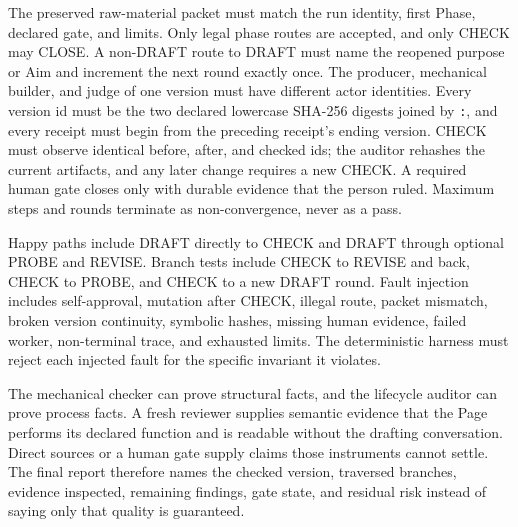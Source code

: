 The preserved raw-material packet must match the run identity, first Phase, declared gate, and limits. Only legal phase routes are accepted, and only CHECK may CLOSE. A non-DRAFT route to DRAFT must name the reopened purpose or Aim and increment the next round exactly once. The producer, mechanical builder, and judge of one version must have different actor identities. Every version id must be the two declared lowercase SHA-256 digests joined by \texttt{:}, and every receipt must begin from the preceding receipt's ending version. CHECK must observe identical before, after, and checked ids; the auditor rehashes the current artifacts, and any later change requires a new CHECK. A required human gate closes only with durable evidence that the person ruled. Maximum steps and rounds terminate as non-convergence, never as a pass.

Happy paths include DRAFT directly to CHECK and DRAFT through optional PROBE and REVISE. Branch tests include CHECK to REVISE and back, CHECK to PROBE, and CHECK to a new DRAFT round. Fault injection includes self-approval, mutation after CHECK, illegal route, packet mismatch, broken version continuity, symbolic hashes, missing human evidence, failed worker, non-terminal trace, and exhausted limits. The deterministic harness must reject each injected fault for the specific invariant it violates.

The mechanical checker can prove structural facts, and the lifecycle auditor can prove process facts. A fresh reviewer supplies semantic evidence that the Page performs its declared function and is readable without the drafting conversation. Direct sources or a human gate supply claims those instruments cannot settle. The final report therefore names the checked version, traversed branches, evidence inspected, remaining findings, gate state, and residual risk instead of saying only that quality is guaranteed.

